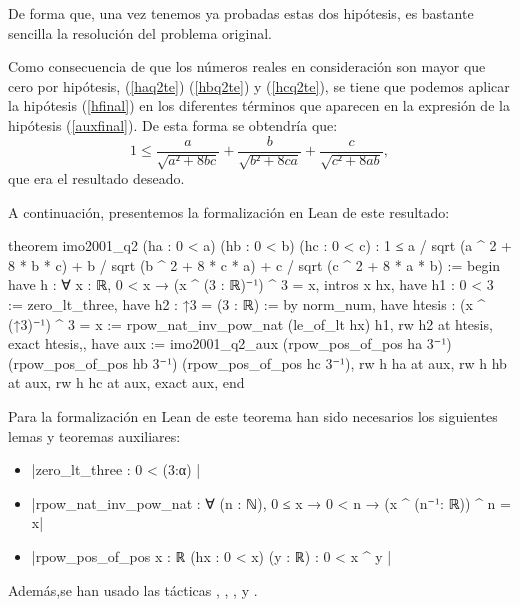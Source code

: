 \begin{demostracion}
  De forma que, una vez tenemos ya probadas estas dos hipótesis, es bastante
  sencilla la resolución del problema original.

  Como consecuencia de que los números reales en consideración son mayor que
  cero por hipótesis, (\ref{haq2te}) (\ref{hbq2te}) y (\ref{hcq2te}), se
  tiene que podemos aplicar la hipótesis (\ref{hfinal}) en los diferentes
  términos que aparecen en la expresión de la hipótesis (\ref{auxfinal}).
  De esta forma se obtendría que:
  \begin{equation}
    1 ≤ \frac{a}{\sqrt{a²+8bc}}+\frac{b}{\sqrt{b²+8ca}}+
        \frac{c}{\sqrt{c²+8ab}},
  \end{equation}
  que era el resultado deseado.
\end{demostracion}

A continuación, presentemos la formalización en Lean de este resultado:

\begin{leancode}
theorem imo2001_q2
  (ha : 0 < a)
  (hb : 0 < b)
  (hc : 0 < c)
  : 1 ≤ a / sqrt (a ^ 2 + 8 * b * c) +
        b / sqrt (b ^ 2 + 8 * c * a) +
        c / sqrt (c ^ 2 + 8 * a * b) :=
begin
  have h : ∀ {x : ℝ}, 0 < x → (x ^ (3 : ℝ)⁻¹) ^ 3 = x,
    { intros x hx,
      have h1 : 0 < 3 :=
        zero_lt_three,
      have h2 : ↑3 = (3 : ℝ) :=
        by norm_num,
      have htesis : (x ^ (↑3)⁻¹) ^ 3 = x :=
        rpow_nat_inv_pow_nat (le_of_lt hx) h1,
      rw h2 at htesis,
      exact htesis,},
  have aux :=
    imo2001_q2_aux (rpow_pos_of_pos ha 3⁻¹)
                   (rpow_pos_of_pos hb 3⁻¹)
                   (rpow_pos_of_pos hc 3⁻¹),
  rw h ha at aux,
  rw h hb at aux,
  rw h hc at aux,
  exact aux,
end
\end{leancode}

Para la formalización en Lean de este teorema han sido necesarios los
siguientes lemas y teoremas auxiliares:
\begin{itemize}
\item {}|zero_lt_three : 0 < (3:α) |
\item {}|rpow_nat_inv_pow_nat : ∀ (n : ℕ), 0 ≤ x → 0 < n →
(x ^ (n⁻¹: ℝ)) ^ n = x|
\item {}|rpow_pos_of_pos {x : ℝ} (hx : 0 < x) (y : ℝ) : 0 < x ^ y |
\end{itemize}

Además,se han usado las tácticas
,
,
,
 y
.
